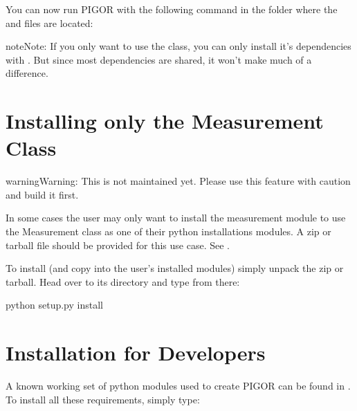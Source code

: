 \documentclass[letterpaper,10pt,english]{sphinxmanual}
\begin{document}
You can now run PIGOR with the following command in the folder where the  and  files are located:

\begin{sphinxVerbatim}[commandchars=\\\{\}]
 
\end{sphinxVerbatim}

\begin{sphinxadmonition}{note}{Note:}
If you only want to use the  class, you can only install it’s dependencies with . But since most dependencies are shared, it won’t make much of a difference.
\end{sphinxadmonition}


\section{Installing only the Measurement Class}
\label{\detokenize{installation:installing-only-the-measurement-class}}
\begin{sphinxadmonition}{warning}{Warning:}
This is not maintained yet. Please use this feature with caution and build it first.
\end{sphinxadmonition}

In some cases the user may only want to install the measurement module to use the Measurement class as one of their python installations modules. A zip or tarball file should be provided for this use case. See .

To install (and copy into the user’s installed modules) simply unpack the zip or tarball. Head over to its directory and type from there:

\begin{sphinxVerbatim}[commandchars=\\\{\}]
python setup.py install
\end{sphinxVerbatim}


\section{Installation for Developers}
\label{\detokenize{installation:installation-for-developers}}
A known working set of python modules used to create PIGOR can be found in . To install all these requirements, simply type:
\end{document}
